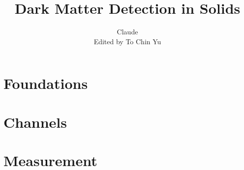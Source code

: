 \documentclass[11pt,twoside,openright]{book}
\title{Dark Matter Detection in Solids}
\author{Claude\\[0.5ex]{\normalsize Edited by To Chin Yu}}
\date{}
\begin{document}
\frontmatter
\maketitle
\tableofcontents

\mainmatter
\part{Foundations}








\part{Channels}









\part{Measurement}





\appendix
{}






\backmatter
\end{document}
